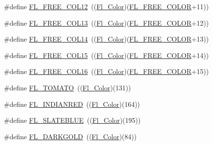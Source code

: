 \begin{DoxyCompactItemize}
\item 
\#define \hyperlink{forms_8_h_ad7fb28e3d0898a60faba71e7aa7b4a66}{F\+L\+\_\+\+F\+R\+E\+E\+\_\+\+C\+O\+L12}~((\hyperlink{_enumerations_8_h_a8b762953646f8abee866061f1af78a6a}{Fl\+\_\+\+Color})(\hyperlink{_enumerations_8_h_aa8fe2e5047a2dd1be37e8336dfca918d}{F\+L\+\_\+\+F\+R\+E\+E\+\_\+\+C\+O\+L\+OR}+11))
\item 
\#define \hyperlink{forms_8_h_a853068bde419603709447ce13dce3a58}{F\+L\+\_\+\+F\+R\+E\+E\+\_\+\+C\+O\+L13}~((\hyperlink{_enumerations_8_h_a8b762953646f8abee866061f1af78a6a}{Fl\+\_\+\+Color})(\hyperlink{_enumerations_8_h_aa8fe2e5047a2dd1be37e8336dfca918d}{F\+L\+\_\+\+F\+R\+E\+E\+\_\+\+C\+O\+L\+OR}+12))
\item 
\#define \hyperlink{forms_8_h_a1216f80f3be0d59515bee9670416439e}{F\+L\+\_\+\+F\+R\+E\+E\+\_\+\+C\+O\+L14}~((\hyperlink{_enumerations_8_h_a8b762953646f8abee866061f1af78a6a}{Fl\+\_\+\+Color})(\hyperlink{_enumerations_8_h_aa8fe2e5047a2dd1be37e8336dfca918d}{F\+L\+\_\+\+F\+R\+E\+E\+\_\+\+C\+O\+L\+OR}+13))
\item 
\#define \hyperlink{forms_8_h_a9459fd87deb89ee6da76e8108545f5ff}{F\+L\+\_\+\+F\+R\+E\+E\+\_\+\+C\+O\+L15}~((\hyperlink{_enumerations_8_h_a8b762953646f8abee866061f1af78a6a}{Fl\+\_\+\+Color})(\hyperlink{_enumerations_8_h_aa8fe2e5047a2dd1be37e8336dfca918d}{F\+L\+\_\+\+F\+R\+E\+E\+\_\+\+C\+O\+L\+OR}+14))
\item 
\#define \hyperlink{forms_8_h_a86dbe791499e2d9ecfcfc974bd6b796f}{F\+L\+\_\+\+F\+R\+E\+E\+\_\+\+C\+O\+L16}~((\hyperlink{_enumerations_8_h_a8b762953646f8abee866061f1af78a6a}{Fl\+\_\+\+Color})(\hyperlink{_enumerations_8_h_aa8fe2e5047a2dd1be37e8336dfca918d}{F\+L\+\_\+\+F\+R\+E\+E\+\_\+\+C\+O\+L\+OR}+15))
\item 
\#define \hyperlink{forms_8_h_a8be9a02692e6edf4b34657e43be087bd}{F\+L\+\_\+\+T\+O\+M\+A\+TO}~((\hyperlink{_enumerations_8_h_a8b762953646f8abee866061f1af78a6a}{Fl\+\_\+\+Color})(131))
\item 
\#define \hyperlink{forms_8_h_acb4647300c40a1434d5370dcafa3f6c1}{F\+L\+\_\+\+I\+N\+D\+I\+A\+N\+R\+ED}~((\hyperlink{_enumerations_8_h_a8b762953646f8abee866061f1af78a6a}{Fl\+\_\+\+Color})(164))
\item 
\#define \hyperlink{forms_8_h_a3e2cd54611ee9b19add1a4da23cf3111}{F\+L\+\_\+\+S\+L\+A\+T\+E\+B\+L\+UE}~((\hyperlink{_enumerations_8_h_a8b762953646f8abee866061f1af78a6a}{Fl\+\_\+\+Color})(195))
\item 
\#define \hyperlink{forms_8_h_a6bde64dcc6e22569398beaa0be750095}{F\+L\+\_\+\+D\+A\+R\+K\+G\+O\+LD}~((\hyperlink{_enumerations_8_h_a8b762953646f8abee866061f1af78a6a}{Fl\+\_\+\+Color})(84))

\end{DoxyCompactItemize}
